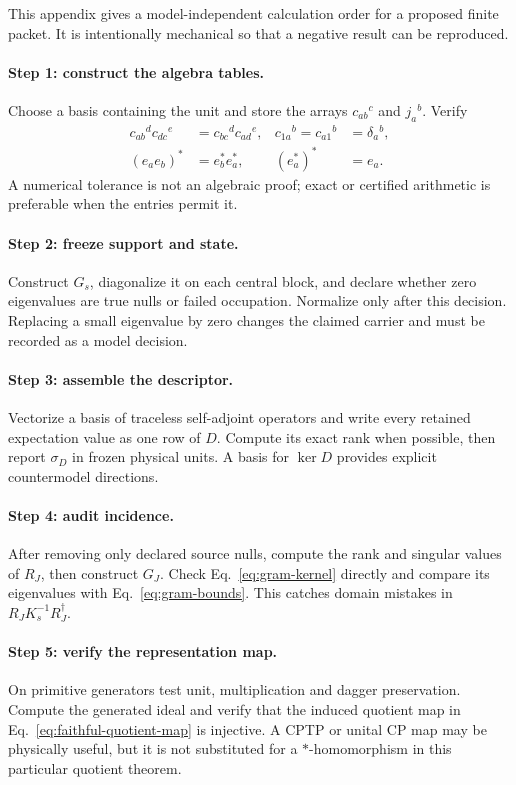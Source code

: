 \documentclass[11pt]{article}
\begin{document}
This appendix gives a model-independent calculation order for a proposed
finite packet.  It is intentionally mechanical so that a negative result can
be reproduced.

\paragraph{Step 1: construct the algebra tables.}
Choose a basis containing the unit and store the arrays
\(c_{ab}{}^c\) and \(j_a{}^b\).  Verify
\begin{align}
 c_{ab}{}^dc_{dc}{}^e&=c_{bc}{}^dc_{ad}{}^e,
 & c_{1a}{}^b=c_{a1}{}^b&=\delta_a{}^b,\\
 (e_ae_b)^*&=e_b^*e_a^*,
 & (e_a^*)^*&=e_a.
\end{align}
A numerical tolerance is not an algebraic proof; exact or certified arithmetic
is preferable when the entries permit it.

\paragraph{Step 2: freeze support and state.}
Construct \(G_s\), diagonalize it on each central block, and declare whether
zero eigenvalues are true nulls or failed occupation.  Normalize only after
this decision.  Replacing a small eigenvalue by zero changes the claimed
carrier and must be recorded as a model decision.

\paragraph{Step 3: assemble the descriptor.}
Vectorize a basis of traceless self-adjoint operators and write every retained
expectation value as one row of \(D\).  Compute its exact rank when possible,
then report \(\sigma_D\) in frozen physical units.  A basis for \(\ker D\)
provides explicit countermodel directions.

\paragraph{Step 4: audit incidence.}
After removing only declared source nulls, compute the rank and singular values
of \(R_J\), then construct \(G_J\).  Check
Eq.~\eqref{eq:gram-kernel} directly and compare its eigenvalues with
Eq.~\eqref{eq:gram-bounds}.  This catches domain mistakes in
\(R_JK_s^{-1}R_J^\dagger\).

\paragraph{Step 5: verify the representation map.}
On primitive generators test unit, multiplication and dagger preservation.
Compute the generated ideal and verify that the induced quotient map in
Eq.~\eqref{eq:faithful-quotient-map} is injective.  A CPTP or unital CP map may
be physically useful, but it is not substituted for a \(*\)-homomorphism in
this particular quotient theorem.
\end{document}
